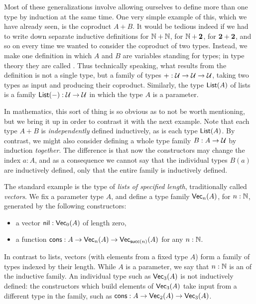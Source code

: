 Most of these generalizations involve allowing ourselves to define more than one type by induction at the same time.
One very simple example of this, which we have already seen, is the coproduct $A+B$.
It would be tedious indeed if we had to write down separate inductive definitions for $\mathbb{N}+\mathbb{N}$, for $\mathbb{N}+\mathbf{2}$, for $\mathbf{2}+\mathbf{2}$, and so on every time we wanted to consider the coproduct of two types.
Instead, we make one definition in which $A$ and $B$ are variables standing for types;
%
in type theory they are called .%
Thus technically speaking, what results from the definition is not a single type, but a family of types $+ : \mathcal{U}\to\mathcal{U}\to\mathcal{U}$, taking two types as input and producing their coproduct.
Similarly, the type $\mathsf{List}(A)$ of lists is a family $\mathsf{List}(-):\mathcal{U}\to\mathcal{U}$ in which the type $A$ is a parameter.

In mathematics, this sort of thing is so obvious as to not be worth mentioning, but we bring it up in order to contrast it with the next example.
Note that each type $A+B$ is \emph{independently} defined inductively, as is each type $\mathsf{List}(A)$.
%
%
By contrast, we might also consider defining a whole type family $B:A\to\mathcal{U}$ by induction \emph{together}.
The difference is that now the constructors may change the index $a:A$, and as a consequence we cannot say that the individual types $B(a)$ are inductively defined, only that the entire family is inductively defined.

%
%
The standard example is the type of \emph{lists of specified length}, traditionally called \emph{vectors}.
We fix a parameter type $A$, and define a type family $\mathsf{Vec}_{n}(A)$, for $n:\mathbb{N}$, generated by the following constructors:
\begin{itemize}
\item a vector $\mathsf{nil}:\mathsf{Vec}_{0}(A)$ of length zero,
\item a function $\mathsf{cons}:A\to \mathsf{Vec}_{n}(A) \to \mathsf{Vec}_{\mathsf{succ} (n)}(A)$ for any $n:\mathbb{N}$.
\end{itemize}
In contrast to lists, vectors (with elements from a fixed type $A$) form a family of types indexed by their length.
While $A$ is a parameter, we say that $n:\mathbb{N}$ is an 
%
of the inductive family.
An individual type such as $\mathsf{Vec}_{3}(A)$ is not inductively defined: the constructors which build elements of $\mathsf{Vec}_{3}(A)$ take input from a different type in the family, such as $\mathsf{cons}:A \to \mathsf{Vec}_{2}(A) \to \mathsf{Vec}_{3}(A)$.


